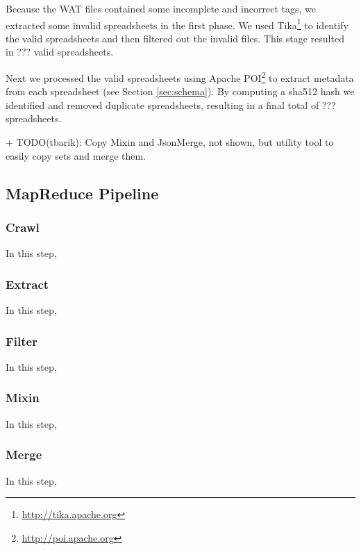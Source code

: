 \documentclass[conference]{IEEEtran}
\begin{document}
Because the WAT files contained some incomplete and incorrect tags, we extracted some invalid spreadsheets in the first phase. We used Tika\footnote{\url{http://tika.apache.org}} to identify the valid spreadsheets and then filtered out the invalid files. This stage resulted in ??? valid spreadsheets.
 
Next we processed the valid spreadsheets using Apache POI\footnote{\url{http://poi.apache.org}} to extract metadata from each spreadsheet (see Section \ref{sec:schema}). By computing a sha512 hash we identified and removed duplicate spreadsheets, resulting in a final total of ??? spreadsheets. 

+ TODO(tbarik): Copy Mixin and JsonMerge, not shown, but utility tool to easily copy sets and merge them.

\subsection{MapReduce Pipeline}

\subsubsection{Crawl} 

In this step, 

\subsubsection{Extract} 

In this step,

\subsubsection{Filter} 

In this step,
\subsubsection{Mixin} 

In this step,

\subsubsection{Merge} 

In this step,


\end{document}
